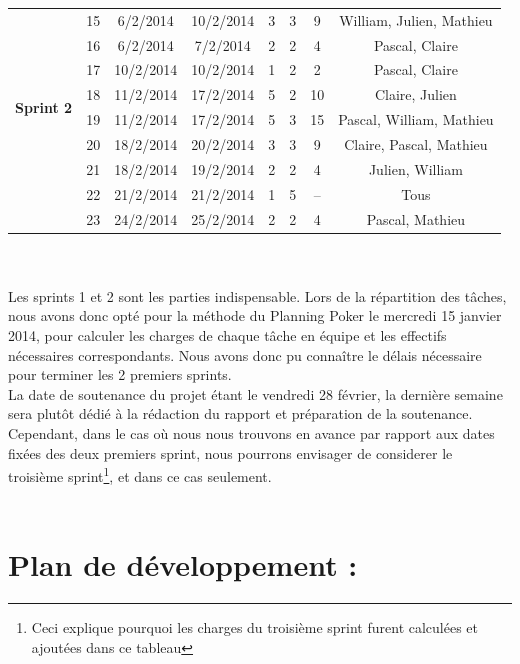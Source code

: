 \documentclass[a4paper,11pt,french]{article}
\begin{document}
\begin{tabular}{|c|c|c|c|c|c|c|c|}
\hline
&&&&&&&\\
\hline
\multirow{8}{*}{\begin{sideways}\textbf{Sprint 2}\end{sideways}}
&15 		& 6/2/2014 		& 10/2/2014 		& 3		& 3 		& 9			& William, Julien, Mathieu\\
\cline{2-8}
&16 		& 6/2/2014 		& 7/2/2014 			& 2 	& 2 		& 4			& Pascal, Claire\\
\cline{2-8}
&17 		& 10/2/2014 	& 10/2/2014 		& 1 	& 2 		& 2			& Pascal, Claire\\
\cline{2-8}
&18 		& 11/2/2014 	& 17/2/2014 		& 5 	& 2 		& 10		& Claire, Julien\\
\cline{2-8}
&19 		& 11/2/2014 	& 17/2/2014 		& 5 	& 3 		& 15		& Pascal, William, Mathieu\\
\cline{2-8}
&20 		& 18/2/2014 	& 20/2/2014 		& 3 	& 3 		& 9			& Claire, Pascal, Mathieu\\
\cline{2-8}
&21 		& 18/2/2014 	& 19/2/2014 		& 2 	& 2 		& 4			& Julien, William\\
\cline{2-8}
&22 		& 21/2/2014 	& 21/2/2014 		& 1 	& 5 		& --		& Tous\\
\cline{2-8}
&23 		& 24/2/2014 	& 25/2/2014 		& 2 	& 2 		& 4
		& Pascal, Mathieu\\
\hline
\end{tabular}
\\ \\

Les sprints 1 et 2 sont les parties indispensable. Lors de la répartition des tâches, nous avons donc opté pour la méthode du Planning Poker le mercredi 15 janvier 2014, pour calculer les charges de chaque tâche en équipe et les effectifs nécessaires correspondants. Nous avons donc pu connaître le délais nécessaire pour terminer les 2 premiers sprints.
\\

La date de soutenance du projet étant le vendredi 28 février, la dernière semaine sera plutôt dédié à la rédaction du rapport et préparation de la soutenance. Cependant, dans le cas où nous nous trouvons en avance par rapport aux dates fixées des deux premiers sprint, nous pourrons envisager de considerer le troisième sprint\footnote{Ceci explique pourquoi les charges du troisième sprint furent calculées et ajoutées dans ce tableau}, et dans ce cas seulement.
\\ \\

\newpage

\section{Plan de développement :}
\end{document}
